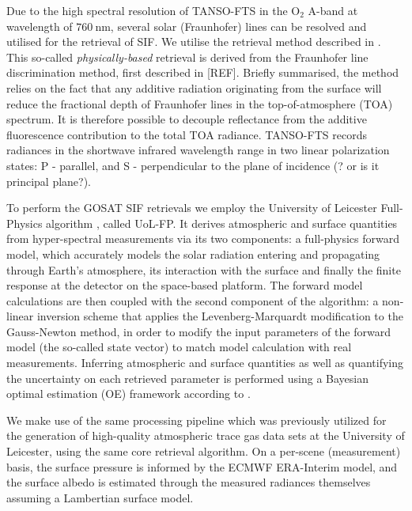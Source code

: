 \documentclass[review, a4paper, 10pt, times]{elsarticle}
\begin{document}
Due to the high spectral resolution of TANSO-FTS in the O$_2$ A-band at wavelength of $760\:\mathrm{nm}$, several solar (Fraunhofer) lines can be resolved and utilised for the retrieval of SIF. We utilise the retrieval method described in \citet{Frankenberg2011}. This so-called \textit{physically-based} retrieval is derived from the Fraunhofer line discrimination method, first described in [REF]. Briefly summarised, the method relies on the fact that any additive radiation originating from the surface will reduce the fractional depth of Fraunhofer lines in the top-of-atmosphere (TOA) spectrum. It is therefore possible to decouple reflectance from the additive fluorescence contribution to the total TOA radiance. TANSO-FTS records radiances in the shortwave infrared wavelength range in two linear polarization states: P - parallel, and S - perpendicular to the plane of incidence (? or is it principal plane?).

To perform the GOSAT SIF retrievals we employ the University of Leicester Full-Physics algorithm \citep{Cogan2012}, called UoL-FP. It derives atmospheric and surface quantities from hyper-spectral measurements via its two components: a full-physics forward model, which accurately models the solar radiation entering and propagating through Earth's atmosphere, its interaction with the surface and finally the finite response at the detector on the space-based platform. The forward model calculations are then coupled with the second component of the algorithm: a non-linear inversion scheme that applies the Levenberg-Marquardt modification to the Gauss-Newton method, in order to modify the input parameters of the forward model (the so-called state vector) to match model calculation with real measurements. Inferring atmospheric and surface quantities as well as quantifying the uncertainty on each retrieved parameter is performed using a Bayesian optimal estimation (OE) framework according to \citet{Rodgers2000}.

We make use of the same processing pipeline which was previously utilized for the generation of high-quality atmospheric trace gas data sets \citep{Buchwitz2017,Trent2018} at the University of Leicester, using the same core retrieval algorithm. On a per-scene (measurement) basis, the surface pressure is informed by the ECMWF ERA-Interim model, and the surface albedo is estimated through the measured radiances themselves assuming a Lambertian surface model.
\end{document}
